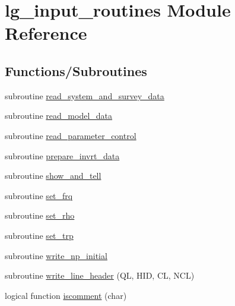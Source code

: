 \hypertarget{namespacelg__input__routines}{}\section{lg\+\_\+input\+\_\+routines Module Reference}
\label{namespacelg__input__routines}
\subsection*{Functions/\+Subroutines}
\begin{DoxyCompactItemize}
\item 
subroutine \hyperlink{namespacelg__input__routines_a80feb058541516d5a6327fb6c344bbbd}{read\+\_\+system\+\_\+and\+\_\+survey\+\_\+data}
\item 
subroutine \hyperlink{namespacelg__input__routines_a39e1903280f0492197231ab5fa752f21}{read\+\_\+model\+\_\+data}
\item 
subroutine \hyperlink{namespacelg__input__routines_a123f91865ea388eca78b77b0d625aa8c}{read\+\_\+parameter\+\_\+control}
\item 
subroutine \hyperlink{namespacelg__input__routines_a3118d974d52f2c98169709e887ceb344}{prepare\+\_\+invrt\+\_\+data}
\item 
subroutine \hyperlink{namespacelg__input__routines_a46a4ddc163c46adad59e863dadde86a3}{show\+\_\+and\+\_\+tell}
\item 
subroutine \hyperlink{namespacelg__input__routines_a836674acd30d52d3aa973722014aaa9f}{set\+\_\+frq}
\item 
subroutine \hyperlink{namespacelg__input__routines_a74107bd43614b32d8679e91def53e94d}{set\+\_\+rho}
\item 
subroutine \hyperlink{namespacelg__input__routines_aff8e77512771c5a25793784a8185d5b0}{set\+\_\+trp}
\item 
subroutine \hyperlink{namespacelg__input__routines_a1e34012960c952d22446828d97881001}{write\+\_\+np\+\_\+initial}
\item 
subroutine \hyperlink{namespacelg__input__routines_abb4589f0c8ad2d2d88f0f52aac5462e6}{write\+\_\+line\+\_\+header} (QL, H\+ID, CL, N\+CL)
\item 
logical function \hyperlink{namespacelg__input__routines_a8433a2003dce3e9ebdd1aa0a11e16538}{iscomment} (char)
\end{DoxyCompactItemize}
